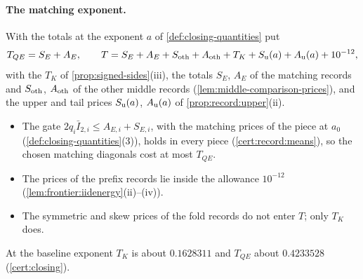 \paragraph{The matching exponent.}
With the totals at the exponent $a$ of \cref{def:closing-quantities} put
\[
 T_{QE}=S_E+A_E,\qquad
 T=S_E+A_E+S_{\rm oth}+A_{\rm oth}+T_K+S_{\rm u}(a)+A_{\rm u}(a)+10^{-12},
\]
with the $T_K$ of \cref{prop:signed-sides}(iii), the totals $S_E$, $A_E$ of the
matching records and $S_{\rm oth}$, $A_{\rm oth}$ of the other middle records
(\cref{lem:middle-comparison-prices}), and the upper and tail prices
$S_{\rm u}(a)$, $A_{\rm u}(a)$ of \cref{prop:record:upper}(ii).
\begin{itemize}
\item The gate $2q_i\bar I_{2,i}\le A_{E,i}+S_{E,i}$, with the matching prices of
 the piece at $a_0$ (\cref{def:closing-quantities}(3)), holds in every piece
 (\cref{cert:record:means}), so the chosen matching diagonals cost at most
 $T_{QE}$.
\item The prices of the prefix records lie inside the allowance $10^{-12}$
 (\cref{lem:frontier:iidenergy}(ii)--(iv)).
\item The symmetric and skew prices of the fold records do not enter $T$; only
 $T_K$ does.
\end{itemize}
At the baseline exponent $T_K$ is about $0.1628311$ and $T_{QE}$ about $0.4233528$
(\cref{cert:closing}).

